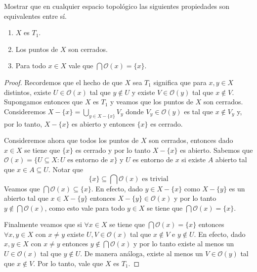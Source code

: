 \documentclass{article}
\theoremstyle{definition}
\newenvironment{ejercicio}[1]{\begin{trivlist}
\item[\hskip \labelsep {\bfseries Ejercicio}\hskip \labelsep {\bfseries #1.}]}{\end{trivlist}}
\begin{document}
\begin{ejercicio}{1}
    Mostrar que en cualquier espacio topológico las siguientes propiedades son equivalentes entre sí.
    \begin{enumerate}
        \item \( X \) es \( T_{1} \).
        \item Los puntos de \( X \) son cerrados.
        \item Para todo \( x\in X \) vale que \( \bigcap\mathcal{O}(x)=\{x\} \).
    \end{enumerate}
\end{ejercicio}
\begin{proof}
    Recordemos que el hecho de que \( X \) sea \( T_1 \) significa que para \( x, y \in X \) distintos, existe \( U \in \mathcal{O}(x) \) tal que \( y \notin U \) y existe \( V \in \mathcal{O}(y) \) tal que \( x \notin V \).
    Supongamos entonces que  \( X \) es \( T_1 \) y veamos que los puntos de \( X \) son cerrados.
    Consideremos \( X - \{ x \} = \bigcup_{y \in X - \{ x \}} V_y \) donde \( V_y \in \mathcal{O}(y) \) es tal que \( x \notin V_y \) y, por lo tanto, \( X - \{ x \} \) es abierto y entonces \( \{ x \} \) es cerrado.

    Consideremos ahora que todos los puntos de \( X \) son cerrados, entonces dado \( x \in X \) se tiene que \( \{ x \} \) es cerrado y por lo tanto \( X - \{ x \} \) es abierto. Sabemos que \( \mathcal{O}(x) = \{ U \subseteq X : U \text{ es entorno de } x \} \) y \( U \) es entorno de \( x \) si existe \( A \) abierto tal que \( x \in A \subseteq U \).
    Notar que \[
        \{ x \} \subseteq \bigcap \mathcal{O}(x) \text{ es trivial}
    \]
    Veamos que \( \bigcap \mathcal{O}(x) \subseteq \{ x \} \). En efecto, dado \( y \in X - \{ x \} \) como \( X - \{ y \} \) es un abierto tal que \( x \in X - \{ y \} \) entonces \( X - \{ y \} \in \mathcal{O}(x) \) y por lo tanto \( y \notin \bigcap \mathcal{O}(x) \), como esto vale para todo \( y \in X \) se tiene que \( \bigcap \mathcal{O}(x) = \{ x \} \).

    Finalmente veamos que si \( \forall x \in X \) se tiene que \( \bigcap \mathcal{O}(x) = \{ x \} \) entonces \( \forall x, y \in X \) con \( x \neq y \) existe \( U, V \in \mathcal{O}(x) \) tal que \( x \notin V \) e \( y \notin U \).
    En efecto, dado \( x, y \in X \) con \( x \neq y \) entonces \( y \notin \bigcap \mathcal{O}(x) \) y por lo tanto existe al menos un \( U \in \mathcal{O}(x) \) tal que \( y \notin U \). De manera análoga, existe al menos un \( V \in \mathcal{O}(y) \) tal que \( x \notin V \). Por lo tanto, vale que \( X \) es \( T_1 \).
\end{proof}
\end{document}
